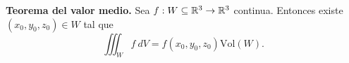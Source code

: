 \begin{theorem} \textbf{Teorema del valor medio.}   Sea $f:W\subseteq\mathbb{R}^3\to\mathbb{R}^3$ continua.  Entonces existe $(x_0,y_0,z_0) \in W$ tal que 
    \[
        \iiint_W f\:dV=f(x_0,y_0,z_0)\text{Vol}(W).
    \]
\end{theorem}
